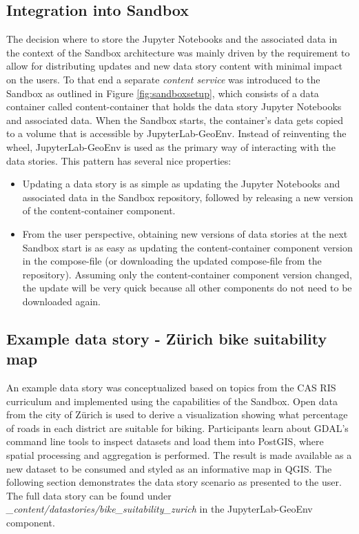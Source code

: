 \documentclass[11pt, a4paper, oneside, parskip=full-]{scrartcl}
\begin{document}
\subsection{Integration into Sandbox}

The decision where to store the Jupyter Notebooks and the associated data in the
context of the Sandbox architecture was mainly driven by the requirement to
allow for distributing updates and new data story content with minimal impact on
the users. To that end a separate \emph{content service} was introduced to the
Sandbox as outlined in Figure \ref{fig:sandboxsetup}, which consists of a data
container called content-container that holds the data story Jupyter Notebooks
and associated data. When the Sandbox starts, the container's data gets copied
to a volume that is accessible by JupyterLab-GeoEnv. Instead of reinventing the
wheel, JupyterLab-GeoEnv is used as the primary way of interacting with the data
stories. This pattern has several nice properties:
\begin{itemize}
  \item Updating a data story is as simple as updating the Jupyter Notebooks and
  associated data in the Sandbox repository, followed by releasing a new version
  of the content-container component.
  \item From the user perspective, obtaining new versions of data stories at the
  next Sandbox start is as easy as updating the content-container component
  version in the compose-file (or downloading the updated compose-file from the
  repository). Assuming only the content-container component version changed,
  the update will be very quick because all other components do not need to be
  downloaded again.
\end{itemize}


\subsection{Example data story - Zürich bike suitability map}
An example data story was conceptualized based on topics from the CAS RIS
curriculum and implemented using the capabilities of the Sandbox. Open data from
the city of Zürich is used to derive a visualization showing what percentage of
roads in each district are suitable for biking. Participants learn about GDAL's
command line tools to inspect datasets and load them into PostGIS, where spatial
processing and aggregation is performed. The result is made available as a new
dataset to be consumed and styled as an informative map in QGIS. The following
section demonstrates the data story scenario as presented to the user. The full
data story can be found under
\emph{\_content/datastories/bike\_suitability\_zurich} in the JupyterLab-GeoEnv
component.
\end{document}
